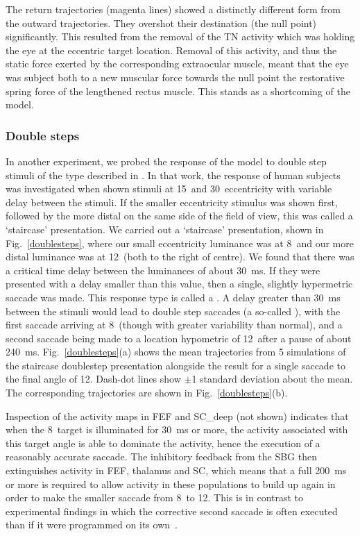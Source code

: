 \documentclass{frontiersSCNS}
\begin{document}
The return trajectories (magenta lines) showed a
distinctly different form from the outward trajectories. They overshot
their destination (the null point) significantly. This resulted from the
removal of the TN activity which was holding the eye at the eccentric
target location. Removal of this activity, and thus the static force
exerted by the corresponding extraocular muscle, meant that the eye
was subject both to a new muscular force towards the null point
 the restorative spring force of the lengthened rectus
muscle. This stands as a shortcoming of the model.

\subsubsection{Double steps}

In another experiment, we probed the response of the model to double step
stimuli of the type described in \cite{becker_analysis_1979}. In that
work, the response of human subjects was investigated when shown stimuli
at 15\dg~and 30\dg~eccentricity with variable delay between
the stimuli. If the smaller eccentricity stimulus was shown first, followed
by the more distal on the same side of the field of view, this was called
a `staircase' presentation.
We carried
out a `staircase' presentation, shown in Fig.~\ref{doublesteps},
where our small eccentricity luminance was at 8\dg~and our more
distal luminance was at 12\dg~(both to the right of centre). We
found that there was a critical time delay between the luminances
of about 30~ms. If they were presented with a delay smaller than this
value, then a single, slightly hypermetric saccade was made. This
response type is called a . A delay greater
than 30~ms between the stimuli would lead to double step saccades
(a so-called ),
with the first saccade arriving at 8\dg~(though with greater
variability than normal), and a second saccade being made
to a location hypometric of 12\dg~after a pause of about 240~ms.
Fig.~\ref{doublesteps}(a) shows the mean trajectories from 5 simulations
of the staircase doublestep presentation alongside the result for a
single saccade to the final angle of 12\dg. Dash-dot lines show
$\pm$1 standard deviation about the mean. The corresponding trajectories
are shown in Fig.~\ref{doublesteps}(b).

Inspection of the activity maps in FEF and SC\_deep (not shown) indicates
that when
the 8\dg~target is illuminated for 30~ms or more, the activity
associated with this target angle is able to dominate the activity,
hence the execution of a reasonably accurate saccade. The inhibitory
feedback from the SBG then extinguishes activity in FEF, thalamus and
SC, which means that a full 200~ms or more is required to allow
activity in these populations to build up again in order to make the
smaller saccade from 8\dg~to 12\dg. This is in contrast
to experimental findings in which the corrective second saccade is
often executed  than if it were programmed on its
own~\citep{becker_analysis_1979}.
\end{document}
